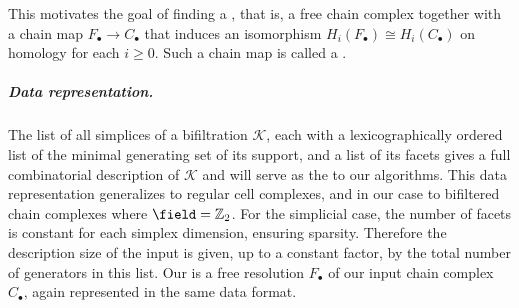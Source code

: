This motivates the goal of finding a , that is, a free chain complex together with a chain map $F_\bullet\rightarrow C_\bullet$ that induces an isomorphism $H_i(F_\bullet)\cong H_i(C_\bullet)$ on homology for each $i\geq 0$.
Such a chain map is called a .
%
%
\subparagraph{Data representation.} The list of all simplices of a bifiltration $\mathcal{K}$, each with a lexicographically ordered list of the minimal generating set of its support, and a list of its facets gives a full combinatorial description of $\mathcal{K}$ and will serve as the  to our algorithms.
This data representation generalizes to regular cell complexes, and in our case to bifiltered chain complexes where $\field=\mathbb{Z}_2$.
For the simplicial case, the number of facets is constant for each simplex dimension, ensuring sparsity.
Therefore the description size of the input is given, up to a constant factor, by the total number of generators in this list. 
Our  is a free resolution $F_\bullet$ of our input chain complex $C_\bullet$, again represented in the same data format. 
%
%
%
